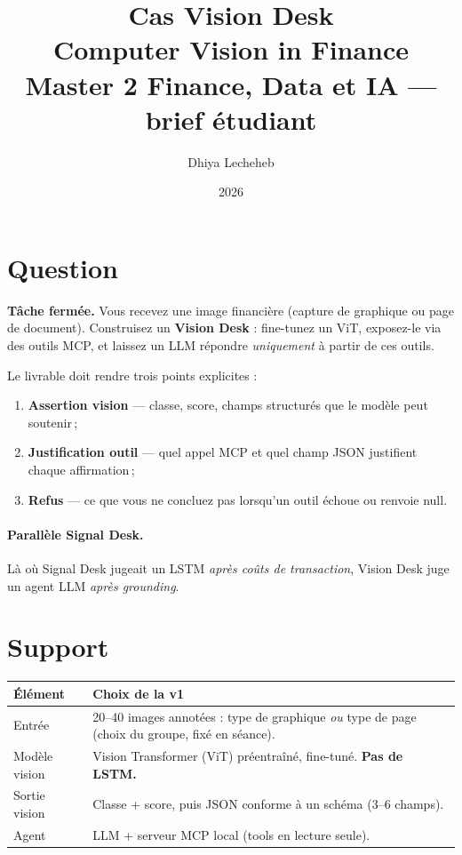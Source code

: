 \documentclass[11pt,a4paper]{article}
\title{%
  \textbf{Cas Vision Desk}\\[0.35em]
  \large Computer Vision in Finance\\[0.5em]
  \normalsize Master 2 Finance, Data et IA --- brief étudiant
}
\author{Dhiya Lecheheb}
\date{2026}
\begin{document}
\maketitle
\thispagestyle{empty}

\section{Question}

\textbf{Tâche fermée.}
Vous recevez une image financière (capture de graphique ou page de document).
Construisez un \textbf{Vision Desk} : fine-tunez un ViT, exposez-le via des outils MCP,
et laissez un LLM répondre \emph{uniquement} à partir de ces outils.

Le livrable doit rendre trois points explicites :
\begin{enumerate}
  \item \textbf{Assertion vision} --- classe, score, champs structurés que le modèle peut soutenir\,;
  \item \textbf{Justification outil} --- quel appel MCP et quel champ JSON justifient chaque affirmation\,;
  \item \textbf{Refus} --- ce que vous ne concluez pas lorsqu'un outil échoue ou renvoie null.
\end{enumerate}

\paragraph{Parallèle Signal Desk.}
Là où Signal Desk jugeait un LSTM \emph{après coûts de transaction}, Vision Desk juge un
agent LLM \emph{après grounding}.

\section{Support}

\begin{center}
\renewcommand{\arraystretch}{1.2}
\begin{tabular}{@{}p{3.2cm}p{11.4cm}@{}}
\toprule
\textbf{Élément} & \textbf{Choix de la v1} \\
\midrule
Entrée & 20--40 images annotées : type de graphique \emph{ou} type de page (choix du groupe, fixé en séance). \\
Modèle vision & Vision Transformer (ViT) préentraîné, fine-tuné. \textbf{Pas de LSTM.} \\
Sortie vision & Classe + score, puis JSON conforme à un schéma (3--6 champs). \\
Agent & LLM + serveur MCP local (tools en lecture seule). \\
\bottomrule
\end{tabular}
\end{center}
\end{document}
